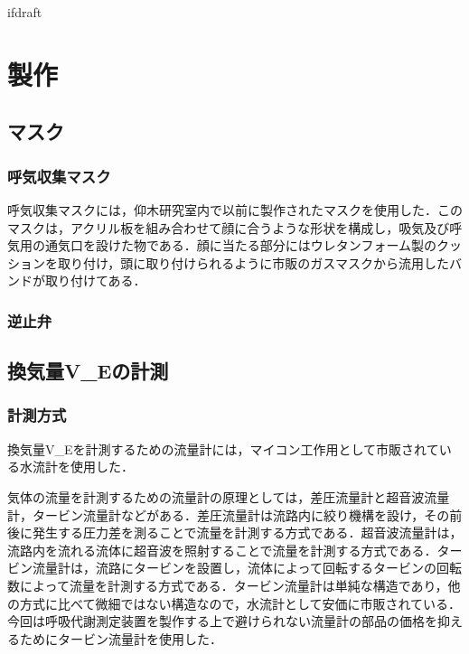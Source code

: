 \expandafter\ifx\csname ifdraft\endcsname\relax
 
\fi

\section{製作}

\subsection{マスク}

\subsubsection{呼気収集マスク}

呼気収集マスクには，仰木研究室内で以前に製作されたマスクを使用した．このマスクは，アクリル板を組み合わせて顔に合うような形状を構成し，吸気及び呼気用の通気口を設けた物である．顔に当たる部分にはウレタンフォーム製のクッションを取り付け，頭に取り付けられるように市販のガスマスクから流用したバンドが取り付けてある．

\subsubsection{逆止弁}

\subsection{換気量V_Eの計測}

\subsubsection{計測方式}

換気量V_Eを計測するための流量計には，マイコン工作用として市販されている水流計を使用した．

気体の流量を計測するための流量計の原理としては，差圧流量計と超音波流量計，タービン流量計などがある．差圧流量計は流路内に絞り機構を設け，その前後に発生する圧力差を測ることで流量を計測する方式である．超音波流量計は，流路内を流れる流体に超音波を照射することで流量を計測する方式である．タービン流量計は，流路にタービンを設置し，流体によって回転するタービンの回転数によって流量を計測する方式である．タービン流量計は単純な構造であり，他の方式に比べて微細ではない構造なので，水流計として安価に市販されている．今回は呼吸代謝測定装置を製作する上で避けられない流量計の部品の価格を抑えるためにタービン流量計を使用した．

